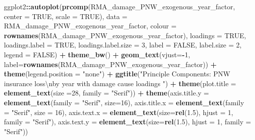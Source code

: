 \documentclass[]{article}
\newenvironment{Shaded}{\begin{snugshade}}{\end{snugshade}}
\newcommand{\CharTok}[1]{\textcolor[rgb]{0.31,0.60,0.02}{#1}}
\newcommand{\DataTypeTok}[1]{\textcolor[rgb]{0.13,0.29,0.53}{#1}}
\newcommand{\DecValTok}[1]{\textcolor[rgb]{0.00,0.00,0.81}{#1}}
\newcommand{\FloatTok}[1]{\textcolor[rgb]{0.00,0.00,0.81}{#1}}
\newcommand{\KeywordTok}[1]{\textcolor[rgb]{0.13,0.29,0.53}{\textbf{#1}}}
\newcommand{\NormalTok}[1]{#1}
\newcommand{\OperatorTok}[1]{\textcolor[rgb]{0.81,0.36,0.00}{\textbf{#1}}}
\newcommand{\OtherTok}[1]{\textcolor[rgb]{0.56,0.35,0.01}{#1}}
\newcommand{\StringTok}[1]{\textcolor[rgb]{0.31,0.60,0.02}{#1}}
\begin{document}
\begin{Shaded}
\begin{Highlighting}[]
\NormalTok{ggplot2}\OperatorTok{::}\KeywordTok{autoplot}\NormalTok{(}\KeywordTok{prcomp}\NormalTok{(RMA_damage_PNW_exogenous_year_factor, }\DataTypeTok{center =} \OtherTok{TRUE}\NormalTok{, }\DataTypeTok{scale =} \OtherTok{TRUE}\NormalTok{),  }\DataTypeTok{data =}\NormalTok{ RMA_damage_PNW_exogenous_year_factor, }\DataTypeTok{colour =} \KeywordTok{rownames}\NormalTok{(RMA_damage_PNW_exogenous_year_factor), }\DataTypeTok{loadings =} \OtherTok{TRUE}\NormalTok{, }\DataTypeTok{loadings.label =} \OtherTok{TRUE}\NormalTok{, }\DataTypeTok{loadings.label.size  =} \DecValTok{3}\NormalTok{, }\DataTypeTok{label =} \OtherTok{FALSE}\NormalTok{, }\DataTypeTok{label.size =} \DecValTok{2}\NormalTok{, }\DataTypeTok{legend =} \OtherTok{FALSE}\NormalTok{)  }\OperatorTok{+}\StringTok{ }\KeywordTok{theme_bw}\NormalTok{()   }\OperatorTok{+}\StringTok{ }\KeywordTok{geom_text}\NormalTok{(}\DataTypeTok{vjust=}\OperatorTok{-}\DecValTok{1}\NormalTok{, }\DataTypeTok{label=}\KeywordTok{rownames}\NormalTok{(RMA_damage_PNW_exogenous_year_factor)) }\OperatorTok{+}\StringTok{ }\KeywordTok{theme}\NormalTok{(}\DataTypeTok{legend.position =} \StringTok{"none"}\NormalTok{) }\OperatorTok{+}\StringTok{ }\KeywordTok{ggtitle}\NormalTok{(}\StringTok{"Principle Components: PNW insurance loss}\CharTok{\textbackslash{}n}\StringTok{by year with damage cause loadings "}\NormalTok{) }\OperatorTok{+}\StringTok{ }\KeywordTok{theme}\NormalTok{(}\DataTypeTok{plot.title =} \KeywordTok{element_text}\NormalTok{(}\DataTypeTok{size =}\DecValTok{28}\NormalTok{, }\DataTypeTok{family =} \StringTok{"Serif"}\NormalTok{)) }\OperatorTok{+}\StringTok{ }\KeywordTok{theme}\NormalTok{(}\DataTypeTok{axis.title.y =} \KeywordTok{element_text}\NormalTok{(}\DataTypeTok{family =} \StringTok{"Serif"}\NormalTok{, }\DataTypeTok{size=}\DecValTok{16}\NormalTok{), }\DataTypeTok{axis.title.x =} \KeywordTok{element_text}\NormalTok{(}\DataTypeTok{family =} \StringTok{"Serif"}\NormalTok{, }\DataTypeTok{size =} \DecValTok{16}\NormalTok{), }\DataTypeTok{axis.text.x =} \KeywordTok{element_text}\NormalTok{(}\DataTypeTok{size=}\KeywordTok{rel}\NormalTok{(}\FloatTok{1.5}\NormalTok{), }\DataTypeTok{hjust =} \DecValTok{1}\NormalTok{, }\DataTypeTok{family =} \StringTok{"Serif"}\NormalTok{), }\DataTypeTok{axis.text.y =} \KeywordTok{element_text}\NormalTok{(}\DataTypeTok{size=}\KeywordTok{rel}\NormalTok{(}\FloatTok{1.5}\NormalTok{), }\DataTypeTok{hjust =} \DecValTok{1}\NormalTok{, }\DataTypeTok{family =} \StringTok{"Serif"}\NormalTok{))}
\end{Highlighting}
\end{Shaded}
\end{document}
